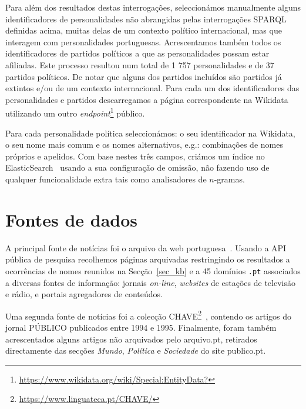 \documentclass[a4paper, twocolumn, 11pt, twoside]{article}
\begin{document}
Para além dos resultados destas interrogações, seleccionámos manualmente alguns identificadores de personalidades não abrangidas pelas interrogações SPARQL definidas acima, muitas delas de um contexto político internacional, mas que interagem com personalidades portuguesas. Acrescentamos também todos os identificadores de partidos políticos a que as personalidades possam estar afiliadas. Este processo resultou num total de 1 757 personalidades e de 37 partidos políticos. De notar que alguns dos partidos incluídos são partidos já extintos e/ou de um contexto internacional. Para cada um dos identificadores das personalidades e partidos descarregamos a página correspondente na Wikidata utilizando um outro \textit{endpoint}\footnote{\url{https://www.wikidata.org/wiki/Special:EntityData?}} público.


Para cada personalidade política seleccionámos: o seu identificador na Wikidata, o seu nome mais comum e os nomes alternativos, e.g.: combinações de nomes próprios e apelidos. Com base nestes três campos, criámos um índice no ElasticSearch~\citep{10.5555/2904394} usando a sua configuração de omissão, não fazendo uso de qualquer funcionalidade extra tais como analisadores de $n$-gramas.

\section{Fontes de dados}
\label{sec:data_sources}

A principal fonte de notícias foi o arquivo da web portuguesa~\citep{SearchPastPWA2013}. Usando a API pública de pesquisa recolhemos páginas arquivadas restringindo os resultados a ocorrências de nomes reunidos na Secção~\ref{sec_kb} e a 45 domínios \texttt{.pt} associados a diversas fontes de informação: jornais \textit{on-line}, \textit{websites} de estações de televisão e rádio, e portais agregadores de conteúdos. 

Uma segunda fonte de notícias foi a colecção CHAVE\footnote{\url{https://www.linguateca.pt/CHAVE/}}~\citep{DBLP:conf/clef/SantosR04, santos-rocha-2001-evaluating}, contendo os artigos do jornal PÚBLICO publicados entre 1994 e 1995. Finalmente, foram também acrescentados alguns artigos não arquivados pelo arquivo.pt, retirados directamente das secções {\it Mundo}, {\it Política} e {\it Sociedade} do site publico.pt. 
\end{document}
